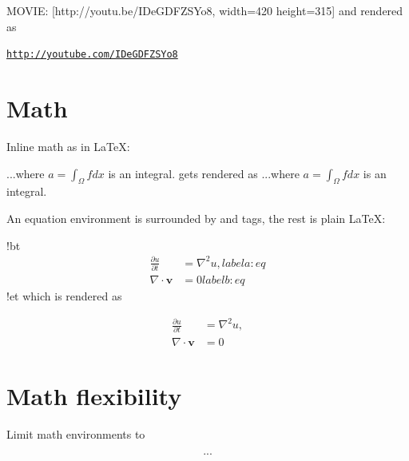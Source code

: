 \documentclass[%
twoside,                 %
draft,                   %
final,                   %
chapterprefix=true,      %
open=right               %
10pt]{book}
\newenvironment{doconce:movie}{}{}
\newcounter{doconce:movie:counter}
\newcounter{doconce:exercise:counter}
\begin{document}
\begin{shadedquoteBlue}
\bccq
MOVIE: [http://youtu.be/IDeGDFZSYo8, width=420 height=315]
\eccq
and rendered as


\begin{doconce:movie}
\begin{center}
\href{{http://youtube.com/IDeGDFZSYo8}}{\nolinkurl{http://youtube.com/IDeGDFZSYo8}}
\end{center}
\end{doconce:movie}


\section*{Math}

Inline math as in {\LaTeX}:

\bccq
...where $a=\int_{\Omega}fdx$ is an integral.
\eccq
gets rendered as ...where $a=\int_{\Omega}fdx$ is an integral.


An equation environment is surrounded by  and  tags,
the rest is plain {\LaTeX}:

\bccq
!bt
\begin{align}
\frac{\partial u}{\partial t} &= \nabla^2 u,
label{a:eq}\\ 
\nabla\cdot\pmb{v} & = 0
label{b:eq}
\end{align}
!et
\eccq
which is rendered as

\begin{align}
\frac{\partial u}{\partial t} &= \nabla^2 u,
\label{a:eq}\\ 
\nabla\cdot\pmb{v} & = 0
\label{b:eq}
\end{align}

\section*{Math flexibility}

Limit math environments to

\bccq
\[ ... \]

\begin{equation*}
\end{equation*}


\end{shadedquoteBlue}
\end{document}
